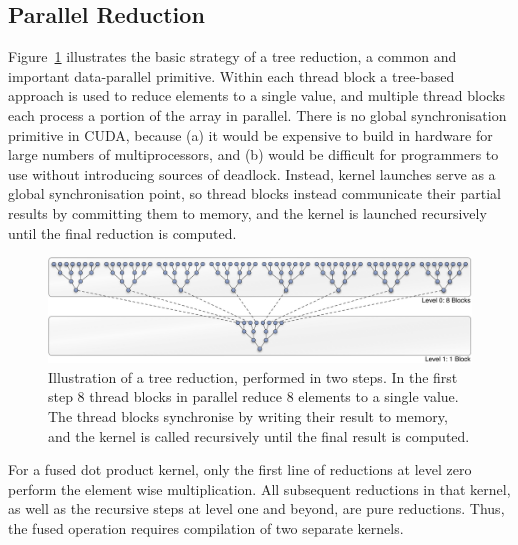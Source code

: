 \subsection{Parallel Reduction}
\label{sec:parallel_reduction}

Figure~\ref{fig:tree_reduction} illustrates the basic strategy of a tree
reduction, a common and important data-parallel primitive. Within each thread
block a tree-based approach is used to reduce elements to a single value, and
multiple thread blocks each process a portion of the array in parallel. There is
no global synchronisation primitive in CUDA, because (a) it would be expensive
to build in hardware for large numbers of multiprocessors, and (b) would be
difficult for programmers to use without introducing sources of deadlock.
Instead, kernel launches serve as a global synchronisation point, so thread
blocks instead communicate their partial results by committing them to memory,
and the kernel is launched recursively until the final reduction is computed.

\begin{figure}[htbp]
    \begin{center}
        \includegraphics[width=\textwidth]{images/sec-4/tree-reduction}
    \end{center}
    \caption[A parallel tree reduction]{Illustration of a tree reduction,
        performed in two steps. In the first step 8 thread blocks in parallel
        reduce 8 elements to a single value. The thread blocks synchronise by
        writing their result to memory, and the kernel is called recursively
        until the final result is computed.}
    \label{fig:tree_reduction}
\end{figure}

For a fused dot product kernel, only the first line of reductions at level zero
perform the element wise multiplication. All subsequent reductions in that
kernel, as well as the recursive steps at level one and beyond, are pure
reductions. Thus, the fused operation requires compilation of two separate
kernels. %

